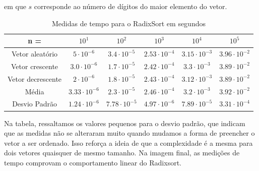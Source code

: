 \documentclass{article}
\begin{document}
em que $s$ corresponde ao número de dígitos do maior elemento do vetor.
%
\begin{table}
    \begin{tabular}{c|c|c|c|c|c}
        n = & $10^{1}$ & $10^{2}$ & $10^{3}$ & $10^{4}$ & $10^{5}$ \\ 
        \hline
        Vetor aleatório & $5\cdot 10^{-6}$ & $3.4\cdot 10^{-5}$ & $2.53\cdot 10^{-4}$ & $3.15\cdot 10^{-3}$ & $3.96\cdot 10^{-2}$ \\
        \hline
        Vetor crescente & $3.0\cdot10^{-6}$ & $1.7\cdot 10^{-5}$ & $2.42\cdot 10^{-4}$ & $3.3\cdot 10^{-3}$ & $3.89\cdot 10^{-2}$\\
        \hline
        Vetor decrescente & $2\cdot10^{-6}$ & $1.8\cdot 10^{-5}$ & $2.43\cdot 10^{-4}$ & $3.12\cdot 10^{-3}$ & $3.89\cdot 10^{-2}$\\
        \hline
        Média & $3.33\cdot 10^{-6}$ & $2.3\cdot 10^{-5}$ & $2.46\cdot10^{-4}$ & $3.2\cdot 10^{-3}$ & $3.92\cdot 10^{-2}$ \\
        \hline
        Desvio Padrão & $1.24\cdot 10^{-6}$ & $7.78\cdot 10^{-5}$ & $4.97\cdot 10^{-6}$ & $7.89\cdot 10^{-5}$ & $3.31\cdot 10^{-4}$ \\
    \end{tabular}
    \caption{Medidas de tempo para o RadixSort em segundos}
\end{table}\par
%
Na tabela, ressaltamos os valores pequenos para o desvio padrão, que indicam que as medidas não se alteraram muito quando mudamos a forma de preencher o vetor a ser ordenado. Isso reforça a ideia de que a complexidade é a mesma para dois vetores quaisquer de mesmo tamanho. Na imagem final, as medições de tempo comprovam o comportamento linear do Radixsort.
\end{document}
